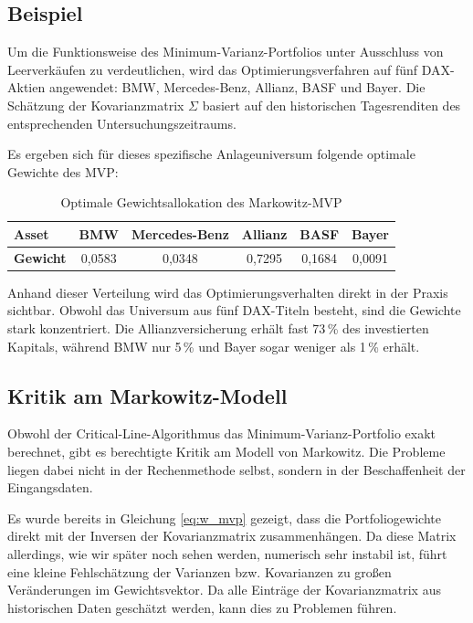 \documentclass[parskip=half]{scrartcl}
\begin{document}
	\subsection{Beispiel}
	
	Um die Funktionsweise des Minimum-Varianz-Portfolios unter Ausschluss von Leerverkäufen zu verdeutlichen, wird das Optimierungsverfahren auf fünf DAX-Aktien angewendet: BMW, Mercedes-Benz, Allianz, BASF und Bayer. Die Schätzung der Kovarianzmatrix $\Sigma$ basiert auf den historischen Tagesrenditen des entsprechenden Untersuchungszeitraums.
	
	Es ergeben sich für dieses spezifische Anlageuniversum folgende optimale Gewichte des MVP:
	
	\begin{table}[H]
		\centering
		\caption{Optimale Gewichtsallokation des Markowitz-MVP}
		\label{tab:markowitz_mvp_5}
		\begin{tabular}{l*5{c}}
			\toprule
			\textbf{Asset} & BMW & Mercedes-Benz & Allianz & BASF & Bayer \\
			\midrule
			\textbf{Gewicht} & 0,0583 & 0,0348 & 0,7295 & 0,1684 & 0,0091 \\
			\bottomrule
		\end{tabular}
	\end{table}
	
	Anhand dieser Verteilung wird das Optimierungsverhalten direkt in der Praxis sichtbar. Obwohl das Universum aus fünf DAX-Titeln besteht, sind die Gewichte stark konzentriert. Die Allianzversicherung erhält fast 73\,\% des investierten Kapitals, während BMW nur 5\,\% und Bayer sogar weniger als 1\,\% erhält.
	
	\subsection{Kritik am Markowitz-Modell}
	
	Obwohl der Critical-Line-Algorithmus das Minimum-Varianz-Portfolio exakt berechnet, gibt es berechtigte Kritik am Modell von Markowitz. Die Probleme liegen dabei nicht in der Rechenmethode selbst, sondern in der Beschaffenheit der Eingangsdaten. 
	
	Es wurde bereits in Gleichung \eqref{eq:w_mvp} gezeigt, dass die Portfoliogewichte direkt mit der Inversen der Kovarianzmatrix zusammenhängen. Da diese Matrix allerdings, wie wir später noch sehen werden, numerisch sehr instabil ist, führt eine kleine Fehlschätzung der Varianzen bzw. Kovarianzen zu großen Veränderungen im Gewichtsvektor. Da alle Einträge der Kovarianzmatrix aus historischen Daten geschätzt werden, kann dies zu Problemen führen.
	
\end{document}
